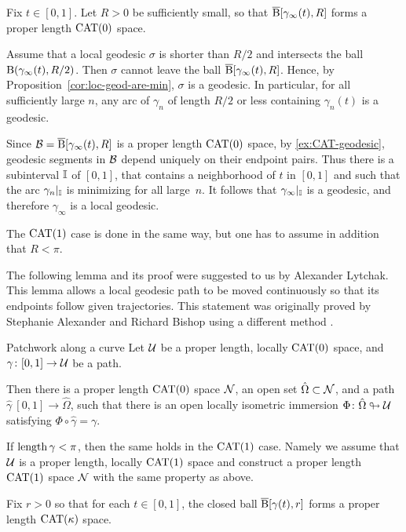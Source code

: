 Fix $t\in[0,1]$.  
Let $R>0$ be sufficiently small, so that $\overline{\mathrm{B}}{}[\gamma_\infty(t),R]$ forms a proper length $\mathrm{CAT}(0)$ space.

Assume that  a local geodesic $\sigma$  is shorter than $R/2$ and intersects the ball $\mathrm{B}{}(\gamma_\infty(t),R/2)$.
Then $\sigma$ cannot leave the ball $\overline{\mathrm{B}}{}[\gamma_\infty(t),R]$.
Hence, by Proposition~\ref{cor:loc-geod-are-min}, $\sigma$ is a geodesic.  
In particular, for all sufficiently large $n$, any arc of $\gamma_n$ of length $R/2$ or less containing $\gamma_n(t)$ is a geodesic.

Since $\mathcal{B}=\overline{\mathrm{B}}{}[\gamma_\infty(t),R]$ is a proper length $\mathrm{CAT}(0)$ space, by \ref{ex:CAT-geodesic},
geodesic segments in $\mathcal{B}$ depend uniquely on their endpoint pairs.  
Thus there is a subinterval $\mathbb{I}$ of $[0,1]$,
that  contains a neighborhood of $t$ in $[0,1]$
and such that the arc $\gamma_n|_{\mathbb{I}}$ is minimizing for all large~$n$.
It follows that $\gamma_\infty|_{\mathbb{I}}$ is a geodesic,
and therefore $\gamma_\infty$ is a local geodesic.

The $\mathrm{CAT}(1)$ case is done in the same way, but one has to assume in addition that $R<\pi$.
\qeds

The following lemma and its proof were suggested to us by Alexander Lytchak.  
This lemma allows  a local geodesic path 
to be moved continuously so that its endpoints follow given trajectories.
This statement was originally proved by Stephanie Alexander and Richard Bishop using a different method \cite{alexander-bishop-1990}.

\begin{thm}{Patchwork along a curve}
\label{lem:patch}
Let $\mathcal{U}$ be a proper length, locally $\mathrm{CAT}(0)$ space, 
and $\gamma\colon[0,1]\to\mathcal{U}$ be a 
 path.

Then there is a proper length  $\mathrm{CAT}(0)$ space   $\mathcal{N}$,
an open set $\hat\Omega\subset \mathcal{N}$,
and a  
 path $\hat\gamma\:[0,1]\to\hat\Omega$,
such that there is an open locally isometric immersion 
$\Phi\colon\hat\Omega\looparrowright\mathcal{U}$ satisfying
$\Phi\circ\hat\gamma=\gamma$.

If $\mathop{\rm length}\nolimits\gamma<\pi$,
then the same holds in the $\mathrm{CAT}(1)$ case.
Namely we assume that $\mathcal{U}$ is a proper length, 
locally $\mathrm{CAT}(1)$ space and construct a proper length $\mathrm{CAT}(1)$ space $\mathcal{N}$ with the same property as above.
\end{thm}

Fix $r>0$ so that for each $t\in[0,1]$,
the closed ball
$\overline{\mathrm{B}}{}[\gamma(t),r]$ forms a proper length $\mathrm{CAT}(\kappa)$ space.

